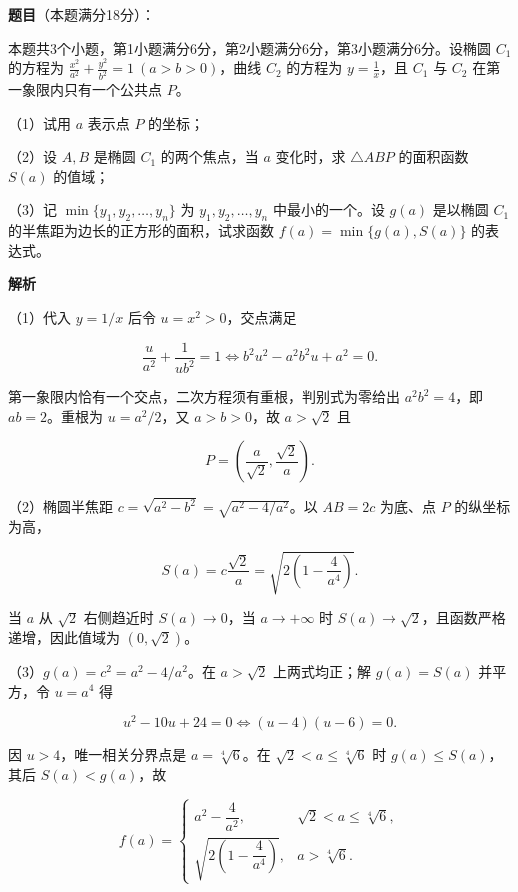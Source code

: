 \begin{answer}

\textbf{题目}（本题满分18分）：

本题共3个小题，第1小题满分6分，第2小题满分6分，第3小题满分6分。设椭圆 $C_1$ 的方程为 $\frac{x^2}{a^2}+\frac{y^2}{b^2}=1\ (a>b>0)$，曲线 $C_2$ 的方程为 $y=\frac1x$，且 $C_1$ 与 $C_2$ 在第一象限内只有一个公共点 $P$。

（1）试用 $a$ 表示点 $P$ 的坐标；

（2）设 $A,B$ 是椭圆 $C_1$ 的两个焦点，当 $a$ 变化时，求 $\triangle ABP$ 的面积函数 $S(a)$ 的值域；

（3）记 $\min\{y_1,y_2,\ldots,y_n\}$ 为 $y_1,y_2,\ldots,y_n$ 中最小的一个。设 $g(a)$ 是以椭圆 $C_1$ 的半焦距为边长的正方形的面积，试求函数 $f(a)=\min\{g(a),S(a)\}$ 的表达式。

\textbf{解析}

（1）代入 $y=1/x$ 后令 $u=x^2>0$，交点满足

\nopagebreak[4]
\[
\frac{u}{a^2}+\frac{1}{ub^2}=1
\iff b^2u^2-a^2b^2u+a^2=0.
\]

第一象限内恰有一个交点，二次方程须有重根，判别式为零给出 $a^2b^2=4$，即 $ab=2$。重根为 $u=a^2/2$，又 $a>b>0$，故 $a>\sqrt2$ 且

\nopagebreak[4]
\[
P=\left(\frac a{\sqrt2},\frac{\sqrt2}{a}\right).
\]

（2）椭圆半焦距 $c=\sqrt{a^2-b^2}=\sqrt{a^2-4/a^2}$。以 $AB=2c$ 为底、点 $P$ 的纵坐标为高，

\nopagebreak[4]
\[
S(a)=c\frac{\sqrt2}{a}=\sqrt{2\left(1-\frac4{a^4}\right)}.
\]

当 $a$ 从 $\sqrt2$ 右侧趋近时 $S(a)\to0$，当 $a\to+\infty$ 时 $S(a)\to\sqrt2$，且函数严格递增，因此值域为 $(0,\sqrt2)$。

（3）$g(a)=c^2=a^2-4/a^2$。在 $a>\sqrt2$ 上两式均正；解 $g(a)=S(a)$ 并平方，令 $u=a^4$ 得

\nopagebreak[4]
\[
u^2-10u+24=0\iff (u-4)(u-6)=0.
\]

因 $u>4$，唯一相关分界点是 $a=\sqrt[4]6$。在 $\sqrt2<a\le\sqrt[4]6$ 时 $g(a)\le S(a)$，其后 $S(a)<g(a)$，故

\nopagebreak[4]
\[
f(a)=\begin{cases}
a^2-\dfrac4{a^2},&\sqrt2<a\le\sqrt[4]6,\\[4pt]
\sqrt{2\left(1-\dfrac4{a^4}\right)},&a>\sqrt[4]6.
\end{cases}
\]


\end{answer}